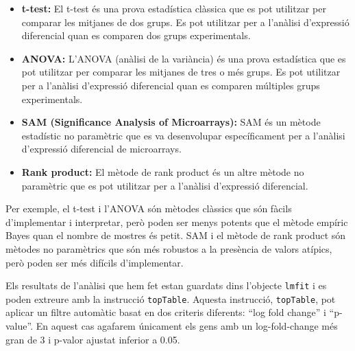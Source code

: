 \documentclass[
]{article}
\begin{document}
\begin{itemize}
\item
  \textbf{t-test:} El t-test és una prova estadística clàssica que es
  pot utilitzar per comparar les mitjanes de dos grups. Es pot utilitzar
  per a l'anàlisi d'expressió diferencial quan es comparen dos grups
  experimentals.
\item
  \textbf{ANOVA:} L'ANOVA (anàlisi de la variància) és una prova
  estadística que es pot utilitzar per comparar les mitjanes de tres o
  més grups. Es pot utilitzar per a l'anàlisi d'expressió diferencial
  quan es comparen múltiples grups experimentals.
\item
  \textbf{SAM (Significance Analysis of Microarrays):} SAM és un mètode
  estadístic no paramètric que es va desenvolupar específicament per a
  l'anàlisi d'expressió diferencial de microarrays.
\item
  \textbf{Rank product:} El mètode de rank product és un altre mètode no
  paramètric que es pot utilitzar per a l'anàlisi d'expressió
  diferencial.
\end{itemize}

Per exemple, el t-test i l'ANOVA són mètodes clàssics que són fàcils
d'implementar i interpretar, però poden ser menys potents que el mètode
empíric Bayes quan el nombre de mostres és petit. SAM i el mètode de
rank product són mètodes no paramètrics que són més robustos a la
presència de valors atípics, però poden ser més difícils d'implementar.

Els resultats de l'anàlisi que hem fet estan guardats dins l'objecte
\texttt{lmfit} i es poden extreure amb la instrucció \texttt{topTable}.
Aquesta instrucció, \texttt{topTable}, pot aplicar un filtre automàtic
basat en dos criteris diferents: ``log fold change'' i ``p-value''. En
aquest cas agafarem únicament els gens amb un log-fold-change més gran
de 3 i p-valor ajustat inferior a 0.05.
\end{document}
